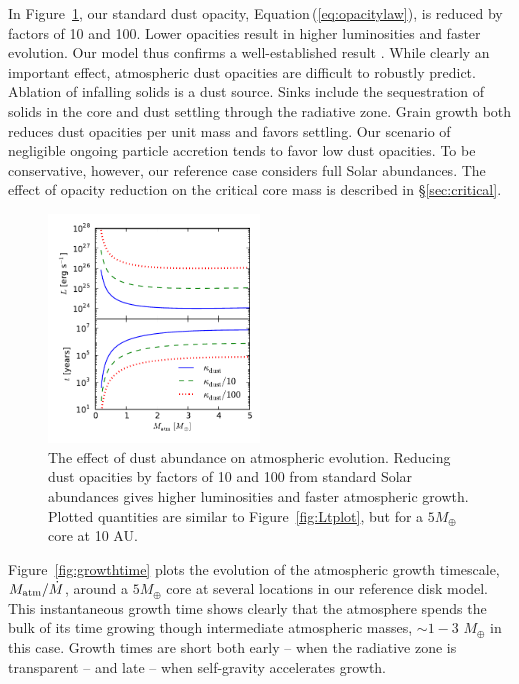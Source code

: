 \documentclass[apj, numberedappendix]{emulateapj}
\newcommand{\Eq}[1]{Equation\,(\ref{#1})}
\newcommand{\Fig}[1]{Figure~\ref{#1}}
\begin{document}
In \Fig{fig:LtvsMopacity}, our standard dust opacity, \Eq{eq:opacitylaw}, is reduced by factors of 10 and 100.  Lower opacities result in higher luminosities and faster evolution.  Our model thus confirms a well-established result \citep{HubBod05}.  While clearly an important effect, atmospheric dust opacities are difficult to robustly predict. Ablation of infalling solids is a dust source.  Sinks include the sequestration of solids in the core and dust settling through the radiative zone.  Grain growth both reduces dust opacities per unit mass and favors settling.  Our scenario of negligible ongoing particle accretion tends to favor low dust opacities.   To be conservative, however, our reference case considers full Solar abundances. The effect of opacity reduction on the critical core mass is described in \S\ref{sec:critical}. 

\begin{figure}[tb]
\centering
\includegraphics[width=0.5\textwidth]{opacity_effect.pdf}
\caption{The effect of dust abundance on atmospheric evolution.   Reducing dust opacities by factors of 10 and 100 from standard Solar abundances gives higher luminosities and faster atmospheric growth.  Plotted quantities are similar to \Fig{fig:Ltplot}, but for a $5 M_{\oplus}$ core at 10 AU. }  %
\label{fig:LtvsMopacity}
\end{figure}

\Fig{fig:growthtime} plots the evolution of the atmospheric growth timescale, $M_{\rm atm}/\dot{M}$,  around a $5 M_{\oplus}$ core at several locations in our reference disk model.  This instantaneous growth time shows clearly that the atmosphere spends the bulk of its time growing though intermediate atmospheric masses, $\sim 1 -3$ $M_\oplus$ in this case.  Growth times are short both early -- when the radiative zone is transparent -- and late -- when self-gravity accelerates growth.  
\end{document}
